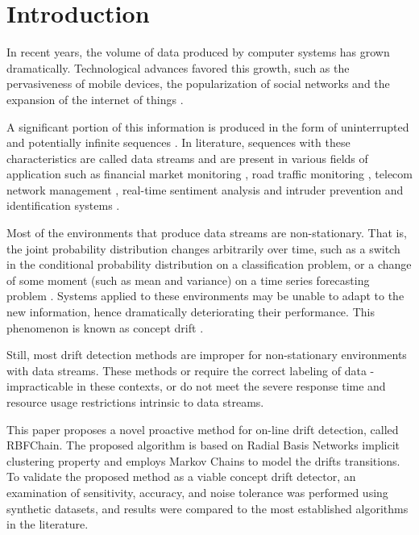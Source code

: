 \documentclass[preprint,12pt]{elsarticle}
\begin{document}
\linenumbers

\section{Introduction}
\label{sec:intro}

In recent years,
the volume of data produced by computer systems has grown dramatically.
Technological advances favored this growth,
such as the pervasiveness of mobile devices,
the popularization of social networks and
the expansion of the internet of things \cite{Cohen:BigData:2009:MSN:1687553.1687576}.

A significant portion of this information is produced in the form of uninterrupted and potentially infinite sequences \cite{Aggarwal:2006:DSM:1196418}.
In literature,
sequences with these characteristics are called data streams and
are present in various fields of application such as
financial market monitoring  \cite{ZHOU:2015},
road traffic monitoring \cite{Wang:2015:EOV:2843092.2843464},
telecom network management \cite{delattre2015method},
real-time sentiment analysis  \cite{KRANJC2015187}
and intruder prevention and identification systems \cite{KENKRE:PAI:COLACO:2015}.

Most of the environments that produce data streams are non-stationary.
That is,
the joint probability distribution changes arbitrarily over time,
such as a switch in the conditional probability distribution on a classification problem,
or a change of some moment (such as mean and variance) on a time series forecasting problem \cite{tsymbal2004problem}.
Systems applied to these environments may be unable to adapt to the new information, hence dramatically deteriorating their performance.
This phenomenon is known as concept drift \cite{Gama:2014:DAF:2670967.2670971}.

Still, most drift detection methods are improper for non-stationary environments with data streams.
These methods or require the correct labeling of data - impracticable in these contexts,
or do not meet the severe response time and resource usage restrictions intrinsic to data streams.

This paper proposes a novel proactive method for on-line drift detection,
called RBFChain.
The proposed algorithm is based on Radial Basis Networks implicit clustering property
and employs Markov Chains to model the drifts transitions.
To validate the proposed method as a viable concept drift detector,
an examination of sensitivity, accuracy,
and noise tolerance was performed using synthetic datasets,
and results were compared to the most established algorithms in the literature.
\end{document}
